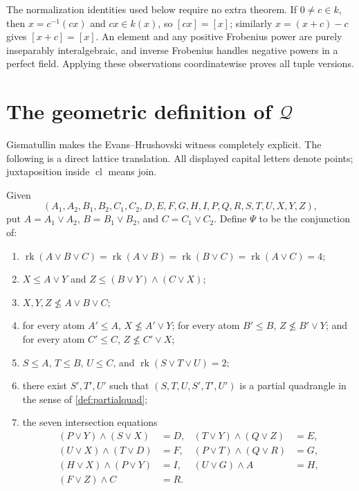 \documentclass[11pt,oneside]{article}
\theoremstyle{definition}
\theoremstyle{remark}
\newcommand{\cl}{\operatorname{cl}}
\newcommand{\rk}{\operatorname{rk}}
\newcommand{\Qrel}{\mathcal{Q}}
\begin{document}
The normalization identities used below require no extra theorem.  If $0\neq c\in k$,
then $x=c^{-1}(cx)$ and $cx\in k(x)$, so $[cx]=[x]$; similarly
$x=(x+c)-c$ gives $[x+c]=[x]$.  An element and any positive Frobenius power are
purely inseparably interalgebraic, and inverse Frobenius handles negative powers in a
perfect field.  Applying these observations coordinatewise proves all tuple versions.

\section[The geometric definition of Q]
{The geometric definition of $\Qrel$}\label{sec:psi}

Gismatullin makes the Evans--Hrushovski witness completely explicit.  The following is a
direct lattice translation.  All displayed capital letters denote points; juxtaposition
inside $\cl$ means join.

Given
\[
(A_1,A_2,B_1,B_2,C_1,C_2,D,E,F,G,H,I,P,Q,R,S,T,U,X,Y,Z),
\]
put $A=A_1\vee A_2$, $B=B_1\vee B_2$, and $C=C_1\vee C_2$.
Define $\Psi$ to be the conjunction of:

\begin{enumerate}[label=(\roman*),leftmargin=12mm]
\item
$\rk(A\vee B\vee C)=\rk(A\vee B)=\rk(B\vee C)=\rk(A\vee C)=4$;
\item $X\leq A\vee Y$ and
$Z\leq(B\vee Y)\wedge(C\vee X)$;
\item $X,Y,Z\not\leq A\vee B\vee C$;
\item for every atom $A'\leq A$, $X\not\leq A'\vee Y$;
for every atom $B'\leq B$, $Z\not\leq B'\vee Y$; and for every atom
$C'\leq C$, $Z\not\leq C'\vee X$;
\item $S\leq A$, $T\leq B$, $U\leq C$, and $\rk(S\vee T\vee U)=2$;
\item there exist $S',T',U'$ such that
$(S,T,U,S',T',U')$ is a partial quadrangle in the sense of
\cref{def:partialquad};
\item the seven intersection equations
\[
\begin{aligned}
(P\vee Y)\wedge(S\vee X)&=D,&
(T\vee Y)\wedge(Q\vee Z)&=E,\\
(U\vee X)\wedge(T\vee D)&=F,&
(P\vee T)\wedge(Q\vee R)&=G,\\
(H\vee X)\wedge(P\vee Y)&=I,&
(U\vee G)\wedge A&=H,\\
(F\vee Z)\wedge C&=R.&
\end{aligned}
\]
\end{enumerate}
\end{document}
